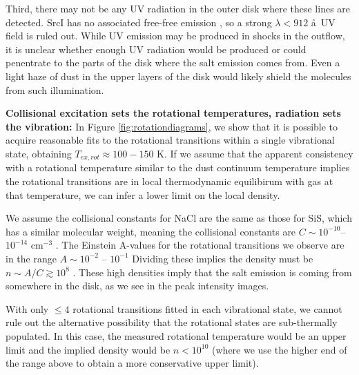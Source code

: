 \documentclass[twocolumn]{aastex62}
\newcommand{\sourcei}{SrcI\xspace}
\begin{document}
Third, there may not be any UV radiation in the outer disk where these lines
are detected.  \sourcei has no associated free-free emission
\citep{Plambeck2013a}, so a strong $\lambda<912$ \aa\ UV field is ruled out.  While UV
emission may be produced in shocks in the outflow, it is unclear whether enough
UV radiation would be produced or could penentrate to the parts of the disk where
the salt emission comes from.  Even a light haze of dust in the upper layers of
the disk would likely shield the molecules from such illumination.

\par{\textbf{Collisional excitation sets the rotational temperatures, radiation
sets the vibration:}}
In Figure \ref{fig:rotationdiagrams}, we show that it is possible to acquire
reasonable fits to the rotational transitions within a single vibrational state,
obtaining $T_{ex,rot}\approx100-150$ K.  If we assume that the apparent consistency
with a rotational temperature similar to the dust continuum temperature implies
the rotational transitions are in local thermodynamic equilibirum with gas at 
that temperature, we can infer a lower limit on the local density.

We assume the collisional constants for NaCl are the same as those for SiS,
which has a similar molecular weight, meaning the collisional constants are
$C\sim10^{-10}$--$10^{-14}$ cm$^{-3}$ \pers \citep{Dayou2006a}.
The Einstein A-values for the rotational transitions we observe are in the range $A\sim10^{-2}$ -- $10^{-1}$ \pers
Dividing these implies the density must be $n\sim A/C \gtrsim10^8$ \percc.
These high densities imply that the salt emission is coming from
somewhere in the disk, as we see in the peak intensity images. 

With only $\leq4$ rotational transitions fitted in each vibrational
state, we cannot rule out the alternative possibility that the rotational
states are sub-thermally populated.  In this case, the measured rotational
temperature would be an upper limit and the implied density would be
$n<10^{10}$ \percc (where we use the higher end of the range above to obtain a
more conservative upper limit). 
\end{document}
